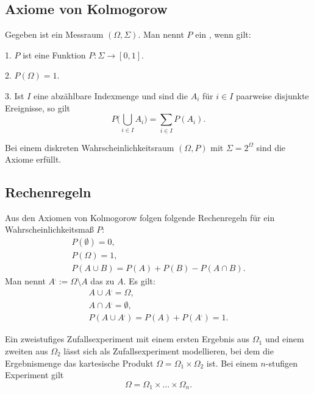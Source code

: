 \subsection{Axiome von Kolmogorow}
\begin{definition}\mbox{}\newline%
%
Gegeben ist ein Messraum $(\Omega,\Sigma)$. Man nennt $P$ ein
, wenn gilt:

1. $P$ ist eine Funktion $P\colon\Sigma\to [0,1]$.

2. $P(\Omega)=1$.

3. Ist $I$ eine abzählbare Indexmenge und sind die $A_i$
für $i\in I$ paarweise disjunkte Ereignisse, so gilt
\begin{equation}
P\Big(\bigcup_{i\in I} A_i\Big) = \sum_{i\in I}P(A_i).
\end{equation}
\end{definition}

\noindent
Bei einem diskreten Wahrscheinlichkeitsraum $(\Omega,P)$ mit
$\Sigma=2^\Omega$ sind die Axiome erfüllt.

\subsection{Rechenregeln}
Aus den Axiomen von Kolmogorow folgen folgende
Rechenregeln für ein Wahrscheinlichkeitsmaß $P$:
\begin{gather}
P(\emptyset) = 0,\\
P(\Omega) = 1,\\
P(A\cup B) = P(A)+P(B)-P(A\cap B).
\end{gather}
Man nennt $A^\comp:=\Omega\setminus A$ das
zu $A$. Es gilt:
\begin{gather}
A\cup A^\comp = \Omega,\\
A\cap A^\comp = \emptyset,\\
P(A\cup A^\comp) = P(A)+P(A^\comp) = 1.
\end{gather}

\minisection{}
Ein zweistufiges Zufallsexperiment mit einem ersten Ergebnis aus
$\Omega_1$ und einem zweiten aus $\Omega_2$ lässt sich als
Zufallsexperiment modellieren, bei dem die Ergebnismenge das
kartesische Produkt $\Omega=\Omega_1\times\Omega_2$ ist. Bei einem
$n$-stufigen Experiment gilt
\begin{equation}
\Omega = \Omega_1\times\ldots\times\Omega_n.
\end{equation}

